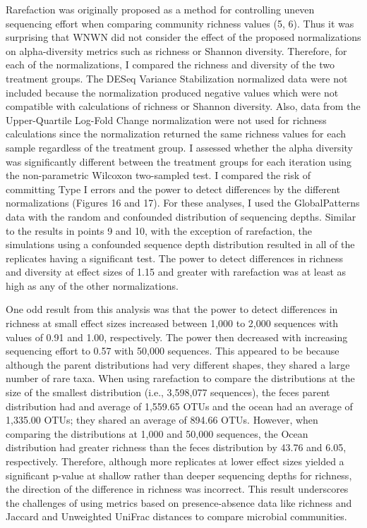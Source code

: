 \documentclass[
]{article}
\begin{document}
Rarefaction was originally proposed as a method for controlling uneven
sequencing effort when comparing community richness values (5, 6). Thus
it was surprising that WNWN did not consider the effect of the proposed
normalizations on alpha-diversity metrics such as richness or Shannon
diversity. Therefore, for each of the normalizations, I compared the
richness and diversity of the two treatment groups. The DESeq Variance
Stabilization normalized data were not included because the
normalization produced negative values which were not compatible with
calculations of richness or Shannon diversity. Also, data from the
Upper-Quartile Log-Fold Change normalization were not used for richness
calculations since the normalization returned the same richness values
for each sample regardless of the treatment group. I assessed whether
the alpha diversity was significantly different between the treatment
groups for each iteration using the non-parametric Wilcoxon two-sampled
test. I compared the risk of committing Type I errors and the power to
detect differences by the different normalizations (Figures 16 and 17).
For these analyses, I used the GlobalPatterns data with the random and
confounded distribution of sequencing depths. Similar to the results in
points 9 and 10, with the exception of rarefaction, the simulations
using a confounded sequence depth distribution resulted in all of the
replicates having a significant test. The power to detect differences in
richness and diversity at effect sizes of 1.15 and greater with
rarefaction was at least as high as any of the other normalizations.

One odd result from this analysis was that the power to detect
differences in richness at small effect sizes increased between 1,000 to
2,000 sequences with values of 0.91 and 1.00, respectively. The power
then decreased with increasing sequencing effort to 0.57 with 50,000
sequences. This appeared to be because although the parent distributions
had very different shapes, they shared a large number of rare taxa. When
using rarefaction to compare the distributions at the size of the
smallest distribution (i.e., 3,598,077 sequences), the feces parent
distribution had and average of 1,559.65 OTUs and the ocean had an
average of 1,335.00 OTUs; they shared an average of 894.66 OTUs.
However, when comparing the distributions at 1,000 and 50,000 sequences,
the Ocean distribution had greater richness than the feces distribution
by 43.76 and 6.05, respectively. Therefore, although more replicates at
lower effect sizes yielded a significant p-value at shallow rather than
deeper sequencing depths for richness, the direction of the difference
in richness was incorrect. This result underscores the challenges of
using metrics based on presence-absence data like richness and Jaccard
and Unweighted UniFrac distances to compare microbial communities.
\end{document}
